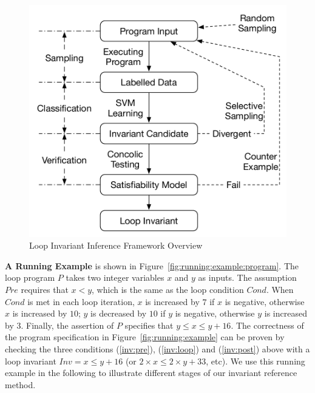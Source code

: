 \begin{figure}[t]
    \centering
    \includegraphics[scale=0.45]{figures/overview.pdf}
    \caption{Loop Invariant Inference Framework Overview}
    \label{fig:overview}
\end{figure}

\medskip\noindent
\textbf{A Running Example}
is shown in Figure~\ref{fig:running:example:program}. 
The loop program $P$ takes two integer variables $x$ and $y$ as inputs. 
The assumption $\mathit{Pre}$ requires that $x < y$, 
which is the same as the loop condition $\mathit{Cond}$. 
When $\mathit{Cond}$ is met in each loop iteration, 
$x$ is increased by $7$ if $x$ is negative, otherwise $x$ is increased by $10$; 
$y$ is decreased by $10$ if $y$ is negative, otherwise $y$ is increased by $3$. 
Finally, the assertion of $P$ specifies that $y \le x \le y + 16$. 
The correctness of the program specification in Figure~\ref{fig:running:example} 
can be proven by checking the three conditions 
(\ref{inv:pre}), (\ref{inv:loop}) and (\ref{inv:post}) above 
with a loop invariant $\mathit{Inv} = x \le y + 16$ (or $2 \times x \le 2 \times y + 33$, etc). 
We use this running example in the following 
to illustrate different stages of our invariant reference method. 

